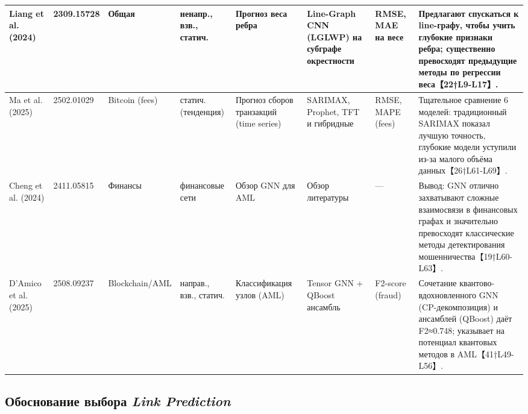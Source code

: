 \begin{table}[ht]
\begin{tabular}{|p{2.3cm}|p{1.3cm}|p{2cm}|p{2cm}|p{2cm}|p{3cm}|p{2cm}|p{3cm}|}
\hline
Liang et al. (2024) & 2309.15728 & Общая & ненапр., взв., статич. & Прогноз веса ребра & Line-Graph CNN (LGLWP) на субграфе окрестности & RMSE, MAE на весе & Предлагают спускаться к line-графу, чтобы учить глубокие признаки ребра; существенно превосходят предыдущие методы по регрессии веса【22†L9-L17】. \\
\hline
Ma et al. (2025) & 2502.01029 & Bitcoin (fees) & статич. (тенденция) & Прогноз сборов транзакций (time series) & SARIMAX, Prophet, TFT и гибридные & RMSE, MAPE (fees) & Тщательное сравнение 6 моделей: традиционный SARIMAX показал лучшую точность, глубокие модели уступили из-за малого объёма данных【26†L61-L69】. \\
\hline
Cheng et al. (2024) & 2411.05815 & Финансы & финансовые сети & Обзор GNN для AML & Обзор литературы & — & Вывод: GNN отлично захватывают сложные взаимосвязи в финансовых графах и значительно превосходят классические методы детектирования мошенничества【19†L60-L63】. \\
\hline
D’Amico et al. (2025) & 2508.09237 & Blockchain/AML & направ., взв., статич. & Классификация узлов (AML) & Tensor GNN + QBoost ансамбль & F2-score (fraud) & Сочетание квантово-вдохновленного GNN (CP-декомпозиция) и ансамблей (QBoost) даёт F2≈0.748; указывает на потенциал квантовых методов в AML【41†L49-L56】. \\
\hline
\end{tabular}
\end{table}

\subsection{Обоснование выбора \emph{Link Prediction}}

